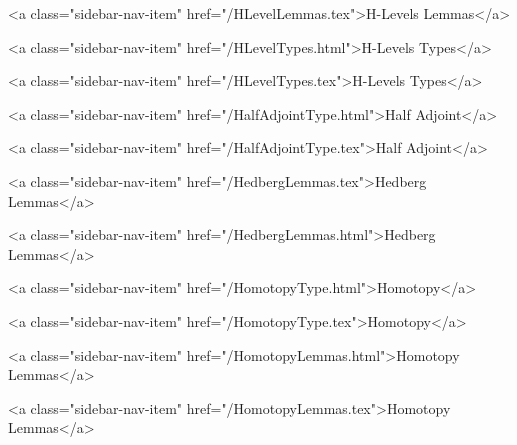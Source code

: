      
        
          <a class="sidebar-nav-item" href="/HLevelLemmas.tex">H-Levels Lemmas</a>
        
      
    
      
        
          <a class="sidebar-nav-item" href="/HLevelTypes.html">H-Levels Types</a>
        
      
    
      
        
          <a class="sidebar-nav-item" href="/HLevelTypes.tex">H-Levels Types</a>
        
      
    
      
        
          <a class="sidebar-nav-item" href="/HalfAdjointType.html">Half Adjoint</a>
        
      
    
      
        
          <a class="sidebar-nav-item" href="/HalfAdjointType.tex">Half Adjoint</a>
        
      
    
      
        
          <a class="sidebar-nav-item" href="/HedbergLemmas.tex">Hedberg Lemmas</a>
        
      
    
      
        
          <a class="sidebar-nav-item" href="/HedbergLemmas.html">Hedberg Lemmas</a>
        
      
    
      
        
          <a class="sidebar-nav-item" href="/HomotopyType.html">Homotopy</a>
        
      
    
      
        
          <a class="sidebar-nav-item" href="/HomotopyType.tex">Homotopy</a>
        
      
    
      
        
          <a class="sidebar-nav-item" href="/HomotopyLemmas.html">Homotopy Lemmas</a>
        
      
    
      
        
          <a class="sidebar-nav-item" href="/HomotopyLemmas.tex">Homotopy Lemmas</a>
        
      
    
